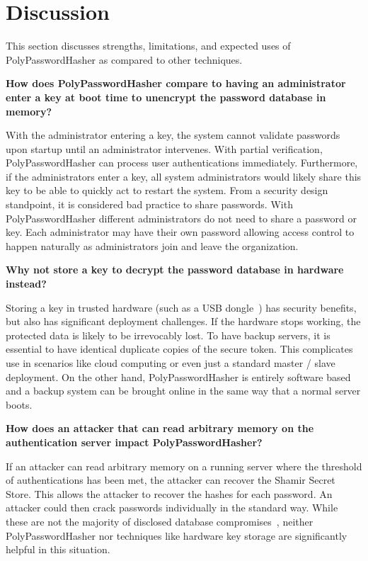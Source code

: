 \section{Discussion}
\label{sec-expecteduse}

This section discusses strengths, limitations, and expected uses of 
PolyPasswordHasher as compared to other techniques.


{\bf How does PolyPasswordHasher compare to having an administrator enter a key
at boot time to unencrypt the password database in memory?}

With the administrator entering a key, the system cannot validate passwords 
upon startup until an administrator intervenes.  With partial verification, 
PolyPasswordHasher can process user authentications immediately.   Furthermore, 
if the administrators enter a key, all system administrators would likely 
share this key to be able to quickly act to restart the system.   From 
a security design standpoint, it is considered bad practice to share
passwords.  With 
PolyPasswordHasher different administrators do not need to share a password or key.
Each administrator may have their own password allowing access control to 
happen naturally as administrators join and leave the organization.


{\bf Why not store a key to decrypt the password database in hardware instead?}

Storing a key in trusted hardware (such as a USB 
dongle~\cite{passwordhardwaredongle}) has security benefits,
but also has significant deployment challenges.  
If the hardware stops working, the protected data is 
likely to be irrevocably lost.  %
To have backup servers, it is essential to have identical 
duplicate copies of the secure token.   This complicates use in scenarios 
like cloud computing or even just a standard master / slave deployment.
On the other hand, PolyPasswordHasher is entirely software based and a backup system
can be brought online in the same way that a normal server boots.



{\bf How does an attacker that can read arbitrary memory on the 
authentication server impact PolyPasswordHasher?}

If an attacker can read arbitrary memory on a running server where the 
threshold of authentications has been met, the attacker can recover
the Shamir Secret Store.   This allows the attacker to recover the 
hashes for each password.   An attacker could then crack passwords
individually in the standard way.    While these are not the majority of
disclosed database compromises~\cite{passwordresearchblog,miranteTR13}, 
neither PolyPasswordHasher nor techniques like hardware key storage 
are significantly helpful in this situation.

